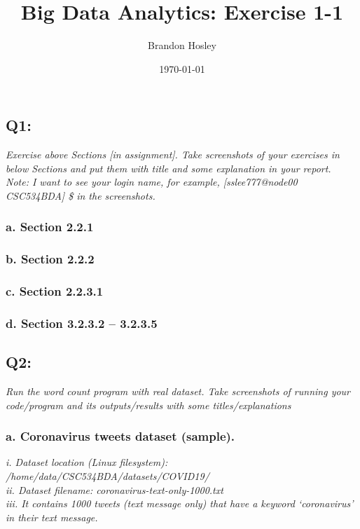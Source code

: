 \documentclass[]{article}
\title{Big Data Analytics: Exercise 1-1}
\author{Brandon Hosley}
\date{\today}
\begin{document}
\maketitle

\subsection*{Q1:}
\emph{Exercise above Sections [in assignment]. 
	Take screenshots of your exercises in below Sections and put
	them with title and some explanation in your report. \\
	Note: I want to see your login name, for example, 
	[sslee777@node00 CSC534BDA] \$ in the screenshots.
}

\subsubsection*{a. Section 2.2.1}
\subsubsection*{b. Section 2.2.2}

\subsubsection*{c. Section 2.2.3.1}

\subsubsection*{d. Section 3.2.3.2 – 3.2.3.5}

\subsection*{Q2:}
\emph{Run the word count program with real dataset. Take screenshots of running your 
	code/program and its outputs/results with some titles/explanations}

\subsubsection*{a. Coronavirus tweets dataset (sample).}
\emph{ i. Dataset location (Linux filesystem): \\
	/home/data/CSC534BDA/datasets/COVID19/ \\
	ii. Dataset filename: coronavirus-text-only-1000.txt \\
	iii. It contains 1000 tweets (text message only) that have a keyword 
	‘coronavirus’ in their text message. }
\end{document}
